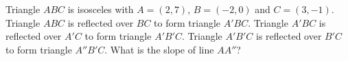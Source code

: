 Triangle $ABC$ is isosceles with $A=(2,7)$, $B=(-2,0)$ and $C=(3,-1)$. Triangle $ABC$ is reflected over $BC$ to form triangle $A'BC$. Triangle $A'BC$ is reflected over $A'C$ to form triangle $A'B'C$. Triangle $A'B'C$ is reflected over $B'C$ to form triangle $A''B'C$. What is the slope of line $AA''$?
